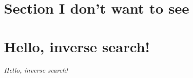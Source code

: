 

\huge

\section{Section I don't want to see}
\lipsum[1]
\newpage

\section{Hello, inverse search!}
\lipsum[2]

\begin{tcolorbox}
    \textit{Hello, inverse search!}
\end{tcolorbox}

\lipsum[3]
\newpage









